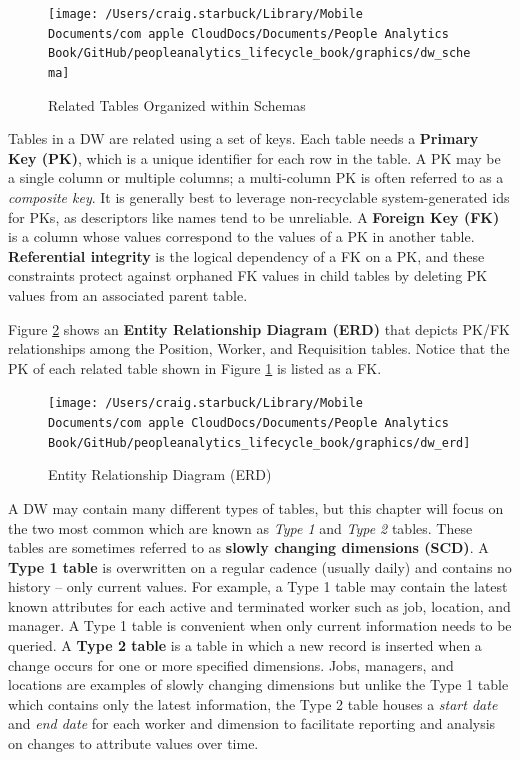 \documentclass[
]{book}
\begin{document}
\begin{figure}

{\centering \texttt{[image: /Users/craig.starbuck/Library/Mobile Documents/com~apple~CloudDocs/Documents/People Analytics Book/GitHub/peopleanalytics\_lifecycle\_book/graphics/dw\_schema]} 

}

\caption{Related Tables Organized within Schemas}\label{fig:dw-schema}
\end{figure}

Tables in a DW are related using a set of keys. Each table needs a \textbf{Primary Key (PK)}, which is a unique identifier for each row in the table. A PK may be a single column or multiple columns; a multi-column PK is often referred to as a \emph{composite key}. It is generally best to leverage non-recyclable system-generated ids for PKs, as descriptors like names tend to be unreliable. A \textbf{Foreign Key (FK)} is a column whose values correspond to the values of a PK in another table. \textbf{Referential integrity} is the logical dependency of a FK on a PK, and these constraints protect against orphaned FK values in child tables by deleting PK values from an associated parent table.

Figure \ref{fig:dw-erd} shows an \textbf{Entity Relationship Diagram (ERD)} that depicts PK/FK relationships among the Position, Worker, and Requisition tables. Notice that the PK of each related table shown in Figure \ref{fig:dw-schema} is listed as a FK.

\begin{figure}

{\centering \texttt{[image: /Users/craig.starbuck/Library/Mobile Documents/com~apple~CloudDocs/Documents/People Analytics Book/GitHub/peopleanalytics\_lifecycle\_book/graphics/dw\_erd]} 

}

\caption{Entity Relationship Diagram (ERD)}\label{fig:dw-erd}
\end{figure}

A DW may contain many different types of tables, but this chapter will focus on the two most common which are known as \emph{Type 1} and \emph{Type 2} tables. These tables are sometimes referred to as \textbf{slowly changing dimensions (SCD)}. A \textbf{Type 1 table} is overwritten on a regular cadence (usually daily) and contains no history -- only current values. For example, a Type 1 table may contain the latest known attributes for each active and terminated worker such as job, location, and manager. A Type 1 table is convenient when only current information needs to be queried. A \textbf{Type 2 table} is a table in which a new record is inserted when a change occurs for one or more specified dimensions. Jobs, managers, and locations are examples of slowly changing dimensions but unlike the Type 1 table which contains only the latest information, the Type 2 table houses a \emph{start date} and \emph{end date} for each worker and dimension to facilitate reporting and analysis on changes to attribute values over time.
\end{document}
